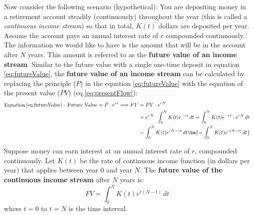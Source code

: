 \noindent Now consider the following scenario (hypothetical):  You are depositing money in a retirement account steadily (continuously) throughout the year (this is called a \emph{continuous income stream}) so that in total, $K(t)$ dollars are deposited per year.  Assume the account pays an annual interest rate of $r$ compounded continuously.  The information we would like to have is the amount that will be in the account after $N$ years.  This amount is referred to as the \textbf{future value of an income stream}. Similar to the future value with a single one-time deposit in equation \ref{eq:futureValue}, the \textbf{future value of an income stream} can be calculated by replacing the principle ($P$) in the equation \ref{eq:futureValue} with the equation of the present value ($PV$) (eq.\ref{eq:presentFlow}):
\begin{displaymath}
        \begin{split}
         \text{Equation}\,\ref{eq:futureValue}:\, \text{Future Value}=P\cdot e^{rt}\Longrightarrow   FV&=PV\cdot e^{rN}\\
            &=e^{rN}\cdot \int_0^N K(t)e^{-rt}\,dt=\int_0^N K(t)e^{-rt}\cdot e^{rN} \,dt\\
            &=\int_0^N K(t)e^{rN-rt} \,dt\bm{=\int_0^N K(t)e^{r(N-t)} \,dt}\\
    \end{split}
\end{displaymath}
\begin{tcolorbox}[title = {Future Value of Income Stream}]
Suppose money can earn interest at an annual interest rate of $r$, compounded continuously. Let $K(t)$ be the rate of continuous income function (in dollars per year) that applies between year 0 and year $N$. The \textbf{future value of the continuous income stream} after $N$ years is:
\begin{equation}
    FV=\int_0^N K(t)e^{r(N-t)} \,dt
\end{equation}
\noindent where $t=0$ to $t=N$ is the time interval.
\end{tcolorbox}
